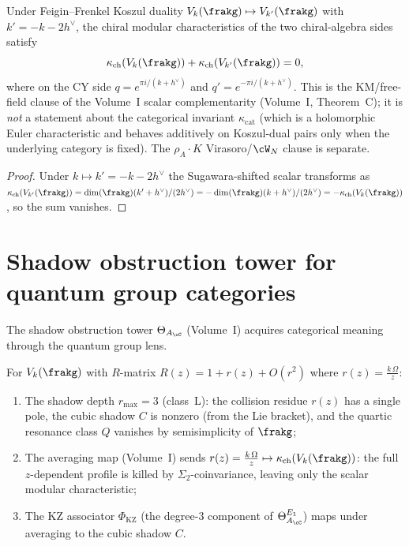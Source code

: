 \begin{proposition}
\label{prop:kappa-cat-complementarity}
Under Feigin--Frenkel Koszul duality
$V_k(\frakg) \mapsto V_{k'}(\frakg)$ with $k' = -k - 2h^\vee$, the
chiral modular characteristics of the two chiral-algebra sides satisfy
\[
 \kappa_{\mathrm{ch}}(V_k(\frakg))
 + \kappa_{\mathrm{ch}}(V_{k'}(\frakg))
 = 0,
\]
where on the CY side $q = e^{\pi i/(k + h^\vee)}$ and
$q' = e^{-\pi i/(k + h^\vee)}$. This is the KM/free-field clause of
the Volume~I scalar complementarity (Volume~I, Theorem~C); it is
\emph{not} a statement about the categorical invariant
$\kappa_{\mathrm{cat}}$ (which is a holomorphic Euler characteristic
and behaves additively on Koszul-dual pairs only when the underlying
category is fixed). The $\rho_A \cdot K$ Virasoro/$\cW_N$ clause is
separate.
\end{proposition}

\begin{proof}
Under $k \mapsto k' = -k - 2h^\vee$ the Sugawara-shifted scalar
transforms as
$\kappa_{\mathrm{ch}}(V_{k'}(\frakg))
 = \dim(\frakg)(k' + h^\vee)/(2h^\vee)
 = -\dim(\frakg)(k + h^\vee)/(2h^\vee)
 = -\kappa_{\mathrm{ch}}(V_k(\frakg))$,
so the sum vanishes.
\end{proof}


\section{Shadow obstruction tower for quantum group categories}
\label{sec:shadow-tower-qg}

The shadow obstruction tower $\Theta_{A_\cC}$
(Volume~I) acquires categorical meaning through the
quantum group lens.

\begin{proposition}
\label{prop:shadow-depth-r-matrix}
For $V_k(\frakg)$ with $R$-matrix
$R(z) = 1 + r(z) + O(r^2)$ where $r(z) = \frac{k\,\Omega}{z}$:
\begin{enumerate}[label=(\roman*)]
 \item The shadow depth $r_{\max} = 3$ (class~L): the collision
 residue $r(z)$ has a single pole, the cubic shadow $C$ is
 nonzero (from the Lie bracket), and the quartic resonance class
 $Q$ vanishes by semisimplicity of $\frakg$;
 \item The averaging map (Volume~I) sends
 $r(z) = \frac{k\,\Omega}{z} \mapsto \kappa_{\mathrm{ch}}(V_k(\frakg))$: the full
 $z$-dependent profile is killed by $\Sigma_2$-coinvariance,
 leaving only the scalar modular characteristic;
 \item The KZ associator $\Phi_{\mathrm{KZ}}$ (the degree-$3$
 component of $\Theta_{A_\cC}^{E_1}$) maps under averaging to
 the cubic shadow $C$.
\end{enumerate}
\end{proposition}


